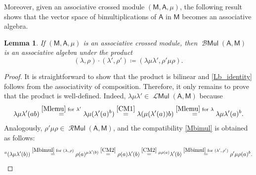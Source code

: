 \documentclass[12pt,reqno]{amsart}
\theoremstyle{plain}
\newtheorem{lemma}[theorem]{Lemma}
\theoremstyle{definition}
\theoremstyle{remark}
\def\lam{\lambda}
\newcommand{\A}{\ensuremath{\mathsf{A}}}
\newcommand{\MM}{\ensuremath{\mathsf{M}}}
\DeclareMathOperator{\LM}{\mathcal{L}\mathsf{Mul}}
\DeclareMathOperator{\RM}{\mathcal{R}\mathsf{Mul}}
\DeclareMathOperator{\Mul}{\mathcal{B}\ensuremath{\mathsf{Mul}}}
\numberwithin{equation}{section}
\begin{document}
 Moreover, given an associative crossed module $(\MM,\A,\mu)$, the following result shows that the vector space of bimultiplications of $\A$ in $\MM$ becomes an associative algebra.
\begin{lemma}\label{L:bimul}
 If $(\MM,\A,\mu)$ is an associative crossed module, then $\Mul(\A, \MM)$ is an associative algebra under the product
\begin{equation}\label{E:bimul}
 (\lam,\rho) \cdot (\lam',\rho')  \coloneqq  (\lam \mu \lam',  \rho' \mu \rho).
\end{equation}
\end{lemma} 
\begin{proof}
	It is straightforward to show that the product is bilinear and \eqref{Lb_identity} follows from the associativity of composition. Therefore, it only remains to prove that the product is well-defined. Indeed, $\lambda\mu\lambda'\in \LM(\A,\MM)$ because
	\[
		\lambda\mu\lambda'(ab)\stackrel{\eqref{Mlemu}\text{ for $\lambda'$}}{=}\lambda\mu(\lambda'(a)^{b})\stackrel{\eqref{CM1}}{=}\lambda(\mu(\lambda'(a))b)\stackrel{\eqref{Mlemu}\text{ for $\lambda$}}{=}\lambda\mu\lambda'(a)^b.
	\]
	Analogously, $\rho'\mu\rho\in\RM(\A,\MM)$, and the compatibility \eqref{Mbimul} is obtained as follows:
	\[
		{}^a(\lambda\mu\lambda'(b))\stackrel{\eqref{Mbimul}\text{ for $(\lambda,\rho)$}}{=}\rho(a)^{\mu\lambda'(b)}\stackrel{\eqref{CM2}}{=}\rho(a)\lambda'(b)\stackrel{\eqref{CM2}}{=}{}^{\mu\rho(a)}\lambda'(b)\stackrel{\eqref{Mbimul}\text{ for $(\lambda',\rho')$}}{=}\rho'\mu\rho(a)^{b}.
	\]
\end{proof}
 
\end{document}
